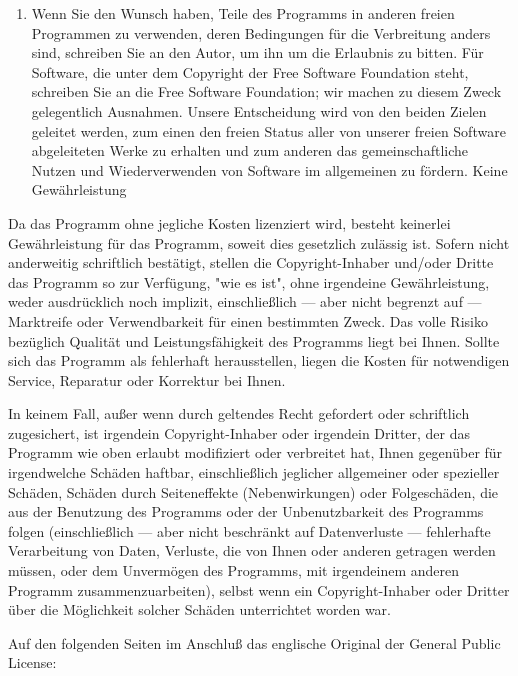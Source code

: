 {\begin{enumerate}
\item Wenn Sie den Wunsch haben, Teile des Programms in anderen freien Programmen zu verwenden, deren Bedingungen für die Verbreitung anders sind, schreiben Sie an den Autor, um ihn um die Erlaubnis zu bitten. Für Software, die unter dem Copyright der Free Software Foundation steht, schreiben Sie an die Free Software Foundation; wir machen zu diesem Zweck gelegentlich Ausnahmen. Unsere Entscheidung wird von den beiden Zielen geleitet werden, zum einen den freien Status aller von unserer freien Software abgeleiteten Werke zu erhalten und zum anderen das gemeinschaftliche Nutzen und Wiederverwenden von Software im allgemeinen zu fördern.
Keine Gewährleistung
\end{enumerate}

{\sc
Da das Programm ohne jegliche Kosten lizenziert wird, besteht keinerlei Gewährleistung für das Programm, soweit dies gesetzlich zulässig ist. Sofern nicht anderweitig schriftlich bestätigt, stellen die Copyright-Inhaber und/oder Dritte das Programm so zur Verfügung, "wie es ist", ohne irgendeine Gewährleistung, weder ausdrücklich noch implizit, einschließlich --- aber nicht begrenzt auf --- Marktreife oder Verwendbarkeit für einen bestimmten Zweck. Das volle Risiko bezüglich Qualität und Leistungsfähigkeit des Programms liegt bei Ihnen. Sollte sich das Programm als fehlerhaft herausstellen, liegen die Kosten für notwendigen Service, Reparatur oder Korrektur bei Ihnen.

In keinem Fall, außer wenn durch geltendes Recht gefordert oder schriftlich zugesichert, ist irgendein Copyright-Inhaber oder irgendein Dritter, der das Programm wie oben erlaubt modifiziert oder verbreitet hat, Ihnen gegenüber für irgendwelche Schäden haftbar, einschließlich jeglicher allgemeiner oder spezieller Schäden, Schäden durch Seiteneffekte (Nebenwirkungen) oder Folgeschäden, die aus der Benutzung des Programms oder der Unbenutzbarkeit des Programms folgen (einschließlich --- aber nicht beschränkt auf Datenverluste --- fehlerhafte Verarbeitung von Daten, Verluste, die von Ihnen oder anderen getragen werden müssen, oder dem Unvermögen des Programms, mit irgendeinem anderen Programm zusammenzuarbeiten), selbst wenn ein Copyright-Inhaber oder Dritter über die Möglichkeit solcher Schäden unterrichtet worden war.
}
}


\vspace{1cm}
Auf den folgenden Seiten im Anschluß das englische Original der General Public License:
\newpage

